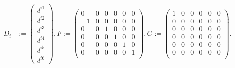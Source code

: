 $$
\begin{aligned}
D_i&:=\begin{pmatrix} d^{i1}\\d^{i2}\\d^{i3}\\d^{i4}\\d^{i5}\\d^{i6} \end{pmatrix},
F:=\begin{pmatrix} 
	0 & 0 & 0 & 0 & 0 & 0 \\ 
	-1 & 0 & 0 & 0 & 0 & 0 \\ 
	0 & 0 & 1 & 0 & 0 & 0 \\ 
	0 & 0 & 0 & 1 & 0 & 0 \\
	0 & 0 & 0 & 0 & 1 & 0 \\	
	0 & 0 & 0 & 0 & 0 & 1 \\
   \end{pmatrix}, 
G:=\begin{pmatrix} 
	1 & 0 & 0 & 0 & 0 & 0 \\ 
	0 & 0 & 0 & 0 & 0 & 0 \\ 
	0 & 0 & 0 & 0 & 0 & 0 \\ 
	0 & 0 & 0 & 0 & 0 & 0 \\ 
	0 & 0 & 0 & 0 & 0 & 0 \\
	0 & 0 & 0 & 0 & 0 & 0 \\
	\end{pmatrix}.\\
\end{aligned}
$$

